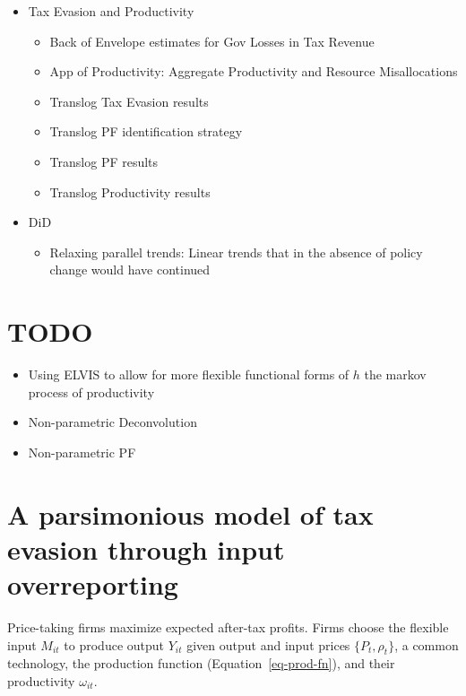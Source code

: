 \documentclass[
  12pt]{article}
\providecommand{\tightlist}{%
  \setlength{\itemsep}{0pt}\setlength{\parskip}{0pt}}\usepackage{longtable,booktabs,array}
\theoremstyle{definition}
\theoremstyle{remark}
\begin{document}
\begin{itemize}
\tightlist
\item
  Tax Evasion and Productivity

  \begin{itemize}
  \tightlist
  \item
    Back of Envelope estimates for Gov Losses in Tax Revenue
  \item
    App of Productivity: Aggregate Productivity and Resource
    Misallocations
  \item
    Translog Tax Evasion results
  \item
    Translog PF identification strategy
  \item
    Translog PF results
  \item
    Translog Productivity results
  \end{itemize}
\item
  DiD

  \begin{itemize}
  \tightlist
  \item
    Relaxing parallel trends: Linear trends that in the absence of
    policy change would have continued
  \end{itemize}
\end{itemize}

\section{TODO}\label{todo}

\begin{itemize}
\tightlist
\item
  Using ELVIS to allow for more flexible functional forms of \(h\) the
  markov process of productivity
\item
  Non-parametric Deconvolution
\item
  Non-parametric PF
\end{itemize}

\section{A parsimonious model of tax evasion through input
overreporting}\label{a-parsimonious-model-of-tax-evasion-through-input-overreporting}

Price-taking firms maximize expected after-tax profits. Firms choose the
flexible input \(M_{it}\) to produce output \(Y_{it}\) given output and
input prices \(\{P_{t}, \rho_t\}\), a common technology, the production
function (Equation~\ref{eq-prod-fn}), and their productivity
\(\omega_{it}\).
\end{document}
